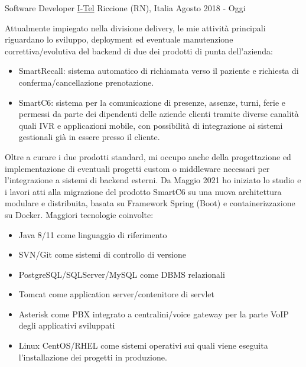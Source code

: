 

\begin{cventries}

  \cventry
    {Software Developer} %
    {\href{https://i-tel.it}{I-Tel}} %
    {Riccione (RN), Italia} %
    {Agosto 2018 - Oggi} %
    {
      	Attualmente impiegato nella divisione delivery, le mie attività principali riguardano lo sviluppo, deployment ed eventuale manutenzione correttiva/evolutiva del backend di due dei prodotti di punta dell'azienda:
      	\begin{itemize}
      		\item {SmartRecall: sistema automatico di richiamata verso il paziente e richiesta di conferma/cancellazione prenotazione.}
      		\item {SmartC6: sistema per la comunicazione di presenze, assenze, turni, ferie e permessi da parte dei dipendenti delle aziende clienti tramite diverse canalità quali IVR e applicazioni mobile, con possibilità di integrazione ai sistemi gestionali già in essere presso il cliente.}
      	\end{itemize}
      	Oltre a curare i due prodotti standard, mi occupo anche della progettazione ed implementazione di eventuali progetti custom o middleware necessari per l'integrazione a sistemi di backend esterni.
      	Da Maggio 2021 ho iniziato lo studio e i lavori atti alla migrazione del prodotto SmartC6 su una nuova architettura modulare e distribuita, basata su Framework Spring (Boot) e containerizzazione su Docker.
      	Maggiori tecnologie coinvolte:
      	\begin{itemize}
      		\item {Java 8/11 come linguaggio di riferimento}
      		\item {SVN/Git come sistemi di controllo di versione}
      		\item {PostgreSQL/SQLServer/MySQL come DBMS relazionali}
      		\item {Tomcat come application server/contenitore di servlet}
      		\item {Asterisk come PBX integrato a centralini/voice gateway per la parte VoIP degli applicativi sviluppati}
      		\item {Linux CentOS/RHEL come sistemi operativi sui quali viene eseguita l'installazione dei progetti in produzione.}
      	\end{itemize}
    }


\end{cventries}
